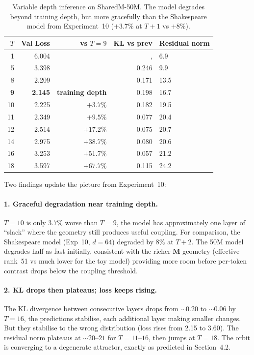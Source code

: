 \documentclass[11pt, a4paper]{article}
\newcommand{\M}{\mathbf{M}}
\theoremstyle{plain}
\theoremstyle{definition}
\theoremstyle{remark}
\begin{document}
\begin{table}[h]
\centering\small
\begin{tabular}{@{}rrrrl@{}}
\toprule
$T$ & Val Loss & vs $T{=}9$ & KL vs prev & Residual norm \\
\midrule
1 & 6.004 & & ,  & 6.9 \\
5 & 3.398 & & 0.246 & 9.9 \\
8 & 2.209 & & 0.171 & 13.5 \\
\textbf{9} & \textbf{2.145} & \textbf{training depth} & 0.198 & 16.7 \\
10 & 2.225 & $+3.7\%$ & 0.182 & 19.5 \\
11 & 2.349 & $+9.5\%$ & 0.077 & 20.4 \\
12 & 2.514 & $+17.2\%$ & 0.075 & 20.7 \\
14 & 2.975 & $+38.7\%$ & 0.080 & 20.6 \\
16 & 3.253 & $+51.7\%$ & 0.057 & 21.2 \\
18 & 3.597 & $+67.7\%$ & 0.115 & 24.2 \\
\bottomrule
\end{tabular}
\caption{Variable depth inference on SharedM-50M. The model degrades beyond training depth, but more gracefully than the Shakespeare model from Experiment~10 ($+3.7\%$ at $T{+}1$ vs $+8\%$).}
\end{table}

Two findings update the picture from Experiment~10:

\paragraph{1. Graceful degradation near training depth.}
$T{=}10$ is only $3.7\%$ worse than $T{=}9$, the model has approximately one layer of ``slack'' where the geometry still produces useful coupling.
For comparison, the Shakespeare model (Exp~10, $d{=}64$) degraded by $8\%$ at $T{+}2$.
The 50M model degrades half as fast initially, consistent with the richer $\M$ geometry (effective rank~51 vs much lower for the toy model) providing more room before per-token contrast drops below the coupling threshold.

\paragraph{2. KL drops then plateaus; loss keeps rising.}
The KL divergence between consecutive layers drops from ${\sim}0.20$ to ${\sim}0.06$ by $T{=}16$, the predictions stabilise, each additional layer making smaller changes.
But they stabilise to the wrong distribution (loss rises from 2.15 to 3.60).
The residual norm plateaus at ${\sim}20$--$21$ for $T{=}11$--$16$, then jumps at $T{=}18$.
The orbit is converging to a degenerate attractor, exactly as predicted in Section~4.2.
\end{document}
